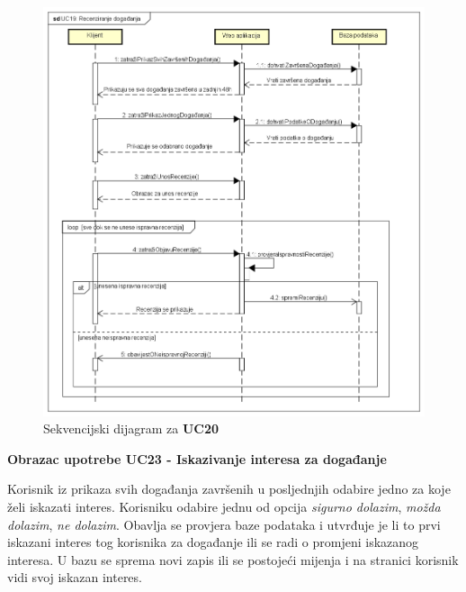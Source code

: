 				\begin{figure}[H]
					\includegraphics[width=\textwidth]{dijagrami/sd2.PNG}
					\centering
					\caption{Sekvencijski dijagram za \textbf{UC20}}
					\label{fig:promjene}
				\end{figure}
				
				\newpage
				
				\noindent \textbf{Obrazac upotrebe UC23 - Iskazivanje interesa za događanje}
				
				\noindent Korisnik iz prikaza svih događanja završenih u posljednjih odabire jedno za koje želi iskazati interes. Korisniku odabire jednu od opcija \textit{sigurno dolazim}, \textit{možda dolazim}, \textit{ne dolazim}. Obavlja se provjera baze podataka i utvrđuje je li to prvi iskazani interes tog korisnika za događanje ili se radi o promjeni iskazanog interesa. U bazu se sprema novi zapis ili se postojeći mijenja i na stranici korisnik vidi svoj iskazan interes.
				
